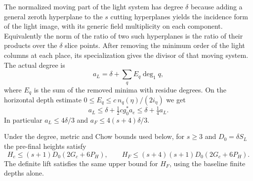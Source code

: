 The normalized moving part of the light
system has degree \(\delta\) because adding a general zeroth
hyperplane to the \(s\) cutting hyperplanes yields the
incidence form of the light image, with its generic field
multiplicity on each component. Equivalently the norm of
the ratio of two such hyperplanes is the ratio of their
products over the \(\delta\) slice points. After removing
the minimum order of the light columns at each place, its
specialization gives the divisor of that moving system.
The actual degree is 
\[
  a_L=\delta+\sum_q E_q\deg_1 q,
\]
where \(E_q\) is the sum of the removed minima with residue
degrees. On the horizontal depth estimate
\(0\le E_q\le c\,n_q(\eta)/(2i_\eta)\) we get
\[
 a_L\le\delta+\tfrac12 c g_0^* a_e
      \le\delta+\tfrac14 a_L .
\]
In particular \(a_L\le4\delta/3\) and
\(a_F\le4(s+4)\delta/3\).

\begin{proposition}
\label{prop:slice-normalized-heights}
Under the degree, metric and Chow bounds used below, for \(s\ge3\) and
\(D_0=\delta S_L\) the pre-final heights satisfy
\[
 H_e\le(s+1)D_0(2G_c+6P_H),\qquad
 H_F\le(s+4)(s+1)D_0(2G_c+6P_H).
\]
The definite lift satisfies the same upper bound for \(H_F\), using
the baseline finite depths alone.
\end{proposition}

